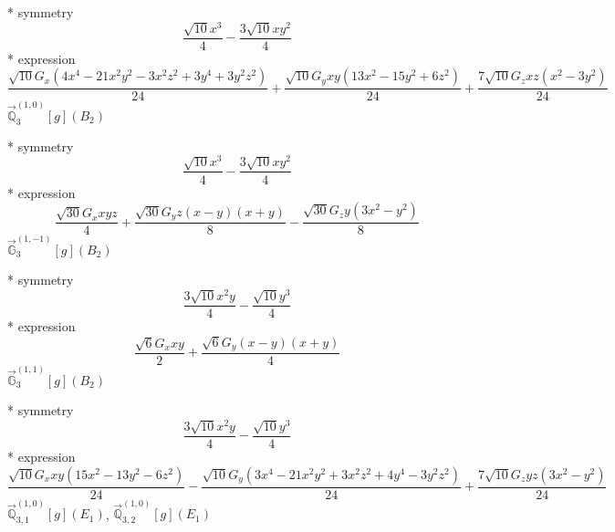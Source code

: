 \documentclass[fleqn,8pt]{jsarticle}
\begin{document}
\noindent\quad ** symmetry
\begin{dmath*}
\frac{\sqrt{10} x^{3}}{4} - \frac{3 \sqrt{10} x y^{2}}{4}
\end{dmath*}
\noindent\quad ** expression
\begin{dmath*}
\frac{\sqrt{10} G_{x} \left(4 x^{4} - 21 x^{2} y^{2} - 3 x^{2} z^{2} + 3 y^{4} + 3 y^{2} z^{2}\right)}{24} + \frac{\sqrt{10} G_{y} x y \left(13 x^{2} - 15 y^{2} + 6 z^{2}\right)}{24} + \frac{7 \sqrt{10} G_{z} x z \left(x^{2} - 3 y^{2}\right)}{24}
\end{dmath*}
\noindent\quad $\vec{\mathbb{Q}}_{3}^{(1,0)}[g](B_{2})$

\noindent\quad ** symmetry
\begin{dmath*}
\frac{\sqrt{10} x^{3}}{4} - \frac{3 \sqrt{10} x y^{2}}{4}
\end{dmath*}
\noindent\quad ** expression
\begin{dmath*}
\frac{\sqrt{30} G_{x} x y z}{4} + \frac{\sqrt{30} G_{y} z \left(x - y\right) \left(x + y\right)}{8} - \frac{\sqrt{30} G_{z} y \left(3 x^{2} - y^{2}\right)}{8}
\end{dmath*}
\noindent\quad $\vec{\mathbb{G}}_{3}^{(1,-1)}[g](B_{2})$

\noindent\quad ** symmetry
\begin{dmath*}
\frac{3 \sqrt{10} x^{2} y}{4} - \frac{\sqrt{10} y^{3}}{4}
\end{dmath*}
\noindent\quad ** expression
\begin{dmath*}
\frac{\sqrt{6} G_{x} x y}{2} + \frac{\sqrt{6} G_{y} \left(x - y\right) \left(x + y\right)}{4}
\end{dmath*}
\noindent\quad $\vec{\mathbb{G}}_{3}^{(1,1)}[g](B_{2})$

\noindent\quad ** symmetry
\begin{dmath*}
\frac{3 \sqrt{10} x^{2} y}{4} - \frac{\sqrt{10} y^{3}}{4}
\end{dmath*}
\noindent\quad ** expression
\begin{dmath*}
\frac{\sqrt{10} G_{x} x y \left(15 x^{2} - 13 y^{2} - 6 z^{2}\right)}{24} - \frac{\sqrt{10} G_{y} \left(3 x^{4} - 21 x^{2} y^{2} + 3 x^{2} z^{2} + 4 y^{4} - 3 y^{2} z^{2}\right)}{24} + \frac{7 \sqrt{10} G_{z} y z \left(3 x^{2} - y^{2}\right)}{24}
\end{dmath*}
\noindent\quad $\vec{\mathbb{Q}}_{3,1}^{(1,0)}[g](E_{1})$, $\vec{\mathbb{Q}}_{3,2}^{(1,0)}[g](E_{1})$
\end{document}
